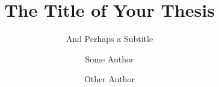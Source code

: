 \documentclass[a4paper,12pt,bachelor]{chalmers-thesis}
\title{The Title of Your Thesis}
\subtitle{And Perhaps a Subtitle}
\author{Some Author\and Other Author}
\begin{document}
\maketitle


\newpage
\mbox{}

% 
% 

%

\end{document}
